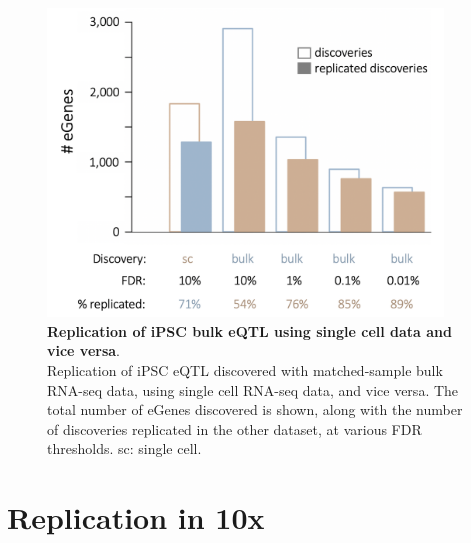 \begin{figure}[h]
\centering
\includegraphics[width=10.5cm]{Chapter3/Fig/sc_vs_bulk_eqtl.png}
\caption[iPSC eQTL (bulk vs sc)]{\textbf{Replication of iPSC bulk eQTL using single cell data and vice versa}.\\
Replication of iPSC eQTL discovered with matched-sample bulk RNA-seq data, using single cell RNA-seq data, and vice versa.
The total number of eGenes discovered is shown, along with the number of discoveries replicated in the other dataset, at various FDR thresholds. 
sc: single cell.}
\label{fig:sc_bulk_egenes}
\end{figure}



\newpage

\section{Replication in 10x}

